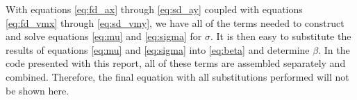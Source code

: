    With equations \ref{eq:fd_ax} through \ref{eq:sd_ay} coupled with equations \ref{eq:fd_vmx} through \ref{eq:sd_vmy}, we have all of the terms needed to construct and solve equations \ref{eq:mu} and \ref{eq:sigma} for $\sigma$. It is then easy to substitute the results of equations \ref{eq:mu} and \ref{eq:sigma} into \ref{eq:beta} and determine $\beta$.  In the code presented with this report, all of these terms are assembled separately and combined. Therefore, the final equation with all substitutions performed will not be shown here.

